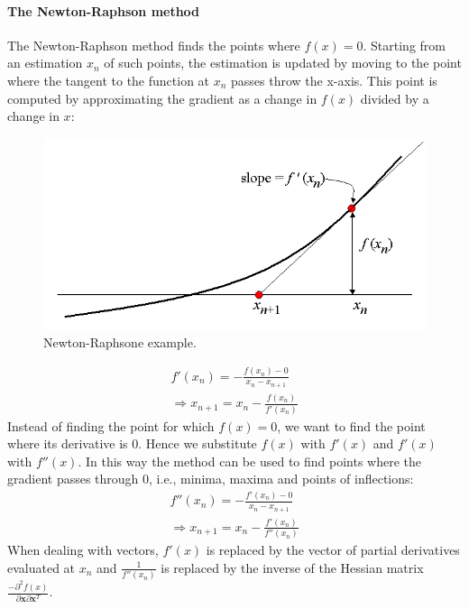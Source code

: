 \documentclass[12pt, letterpaper]{article}
\theoremstyle{definition}
\newcommand{\x}{\mathbf{x}}
\begin{document}
\paragraph{The Newton-Raphson method}
\label{NewtonsMethod}
The Newton-Raphson method finds the points where $f(x)=0$. Starting from an estimation $x_n$ of such points, the estimation is updated by moving to the point where the tangent to the function at $x_n$ passes throw the x-axis. This point is computed by approximating the gradient as a change in $f(x)$ divided by a change in $x$:

\begin{figure}
\centering
\includegraphics[scale=0.3]{img/NewtonRaphson}
\caption{Newton-Raphsone example.}
\end{figure}

\begin{equation}
\begin{aligned}
f'(x_n) = -\frac{f(x_n)-0}{x_n -x_{n+1}}\\
\Rightarrow x_{n+1} = x_n -\frac{f(x_n)}{f'(x_n)}
\end{aligned}
\end{equation}
Instead of finding the point for which $f(x)=0$, we want to find the point where its derivative is $0$. Hence we substitute $f(x)$ with $f'(x)$ and $f'(x)$ with $f''(x)$. In this way the method can be used to find points where the gradient passes through $0$, i.e., minima, maxima and points of inflections:
\begin{equation}
\begin{aligned}
f''(x_n) = -\frac{f'(x_n)-0}{x_n -x_{n+1}}\\
\Rightarrow x_{n+1} = x_n -\frac{f'(x_n)}{f''(x_n)}
\end{aligned}
\end{equation}
When dealing with vectors, $f'(x)$ is replaced by the vector of partial derivatives evaluated at $x_n$ and $\frac{1}{f''(x_n)}$ is replaced by the inverse of the Hessian matrix $\frac{-\partial^2 f(x)}{\partial \x \partial \x^T}$.
\end{document}
